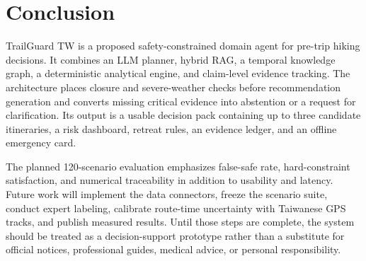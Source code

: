 \documentclass[conference]{IEEEtran}
\begin{document}
\section{Conclusion}
\label{sec:conclusion}
TrailGuard TW is a proposed safety-constrained domain agent for pre-trip hiking
decisions. It combines an LLM planner, hybrid RAG, a temporal knowledge graph,
a deterministic analytical engine, and claim-level evidence tracking. The
architecture places closure and severe-weather checks before recommendation
generation and converts missing critical evidence into abstention or a request
for clarification. Its output is a usable decision pack containing up to three
candidate itineraries, a risk dashboard, retreat rules, an evidence ledger,
and an offline emergency card.

The planned 120-scenario evaluation emphasizes false-safe rate, hard-constraint
satisfaction, and numerical traceability in addition to usability and latency.
Future work will implement the data connectors, freeze the scenario suite,
conduct expert labeling, calibrate route-time uncertainty with Taiwanese GPS
tracks, and publish measured results. Until those steps are complete, the
system should be treated as a decision-support prototype rather than a
substitute for official notices, professional guides, medical advice, or
personal responsibility.
\end{document}
